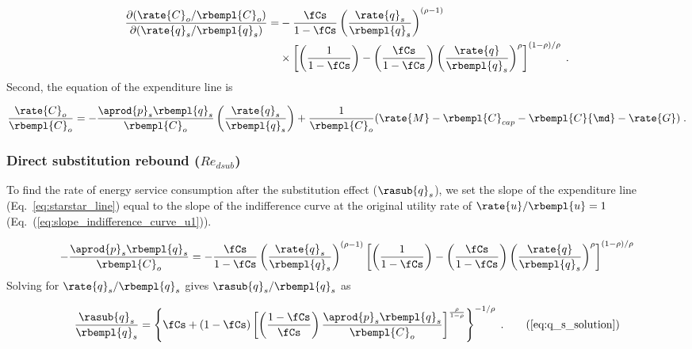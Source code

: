 \begin{align} \label{eq:slope_indifference_curve_u1}
  \frac{\partial (\rate{C}_o/\rbempl{C}_o)}{\partial (\rate{q}_s/\rbempl{q}_s)} =&
        -\frac{\fCs}{1 - \fCs} \left( \frac{\rate{q}_s}{\rbempl{q}_s} \right)^{(\rho -1)} \nonumber  \\
        &\times \left[ \left( \frac{1}{1 - \fCs} \right) 
                - \left( \frac{\fCs}{1 - \fCs} \right) 
                          \left( \frac{\rate{q}}{\rbempl{q}_s} \right)^\rho \right]^{(1 - \rho)/\rho} \; .
\end{align}
%
Second, the equation of the \starstar{} expenditure line is

\begin{equation} \label{eq:starstar_line}
  \frac{\rate{C}_o}{\rbempl{C}_o} = 
      -\frac{\aprod{p}_s \rbempl{q}_s}
            {\rbempl{C}_o}
        \left(  \frac{\rate{q}_s}{\rbempl{q}_s} \right)
      + \frac{1}{\rbempl{C}_o} 
        (\rate{M} - \rbempl{C}_{cap} - \rbempl{C}{\md} - \rate{G}) \; .
\end{equation}


\subsubsection{Direct substitution rebound ($Re_{dsub}$)} 
\label{sec:Redsub_exact}

To find the rate of energy service consumption after the substitution effect
($\rasub{q}_s$), we set the slope of the \starstar{} expenditure line (Eq.~\ref{eq:starstar_line})
equal to the slope of the \iicirc{} indifference curve 
at the original utility rate of $\rate{u}/\rbempl{u} = 1$ (Eq.~(\ref{eq:slope_indifference_curve_u1})).

\begin{equation}
  -\frac{\aprod{p}_s \rbempl{q}_s}
        {\rbempl{C}_o} = 
    -\frac{\fCs}{1 - \fCs} \left( \frac{\rate{q}_s}{\rbempl{q}_s} \right)^{(\rho -1)} %
        \left[ \left( \frac{1}{1 - \fCs} \right) 
                - \left( \frac{\fCs}{1 - \fCs} \right) 
                          \left( \frac{\rate{q}}{\rbempl{q}_s} \right)^\rho \right]^{(1 - \rho)/\rho}
\end{equation}
%
Solving for $\rate{q}_s/\rbempl{q}_s$ gives $\rasub{q}_s/\rbempl{q}_s$ as

\begin{equation}
  \frac{\rasub{q}_s}{\rbempl{q}_s} = \left\{ \fCs + (1-\fCs) 
      \left[ \left(  \frac{1-\fCs}{\fCs}  \right) \frac{\aprod{p}_s \rbempl{q}_s}{\rbempl{C}_o}  \right]
                                                  ^{\frac{\rho}{1-\rho}} \right\} ^ {-1/\rho} \; .
                                                        \tag{\ref{eq:q_s_solution}}
\end{equation}

